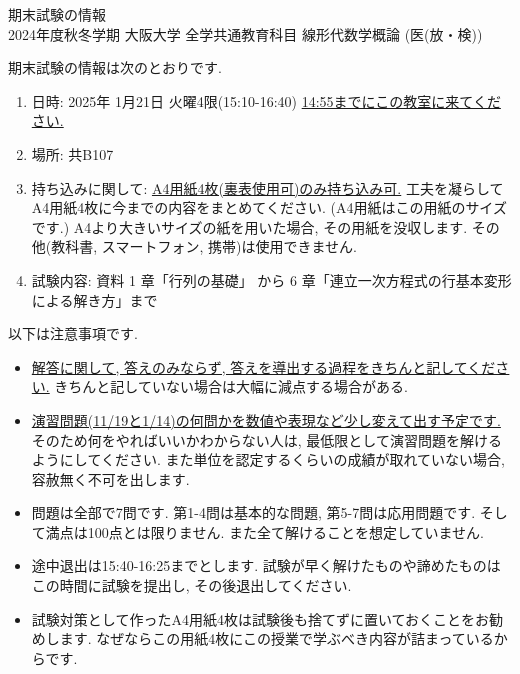 \documentclass[dvipdfmx,a4paper,11pt]{article}
\theoremstyle{definition}
\begin{document}
\pagestyle{empty}




\begin{center}
{\LARGE 期末試験の情報 } \\
2024年度秋冬学期 大阪大学 全学共通教育科目 線形代数学概論 (医(放・検))
\end{center}

期末試験の情報は次のとおりです. 
\begin{enumerate}
\item 日時: 2025年 1月21日 火曜4限(15:10-16:40)  \underline{14:55までにこの教室に来てください.}
\item 場所: 共B107
\item 持ち込みに関して: \underline{A4用紙4枚(裏表使用可)のみ持ち込み可.} 工夫を凝らしてA4用紙4枚に今までの内容をまとめてください. (A4用紙はこの用紙のサイズです.) A4より大きいサイズの紙を用いた場合, その用紙を没収します. その他(教科書, スマートフォン, 携帯)は使用できません.
\item 試験内容: 資料 1 章「行列の基礎」 から 6 章「連立一次方程式の行基本変形による解き方」まで
\end{enumerate}

以下は注意事項です.
\begin{itemize}
  \setlength{\parskip}{0cm} 
 \setlength{\itemsep}{0cm}
 
 \item \underline{解答に関して, 答えのみならず, 答えを導出する過程をきちんと記してください.} きちんと記していない場合は大幅に減点する場合がある.
 \item \underline{演習問題(11/19と1/14)の何問かを数値や表現など少し変えて出す予定です.} そのため何をやればいいかわからない人は, 最低限として演習問題を解けるようにしてください. また単位を認定するくらいの成績が取れていない場合, 容赦無く不可を出します. 
 \item 問題は全部で7問です. 第1-4問は基本的な問題,  第5-7問は応用問題です. そして満点は100点とは限りません. また全て解けることを想定していません. 
\item 途中退出は15:40-16:25までとします. 試験が早く解けたものや諦めたものはこの時間に試験を提出し, その後退出してください. 
\item 試験対策として作ったA4用紙4枚は試験後も捨てずに置いておくことをお勧めします. なぜならこの用紙4枚にこの授業で学ぶべき内容が詰まっているからです. 
\end{itemize}
\end{document}

